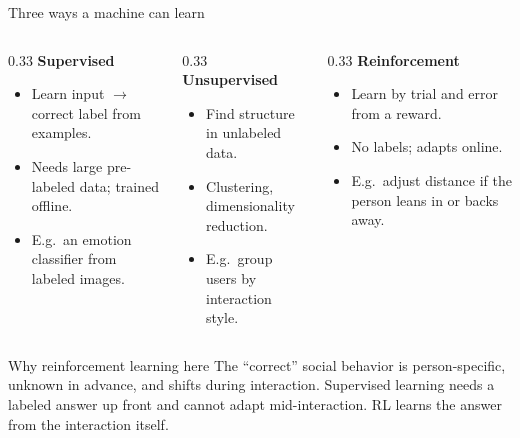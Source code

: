 \documentclass[aspectratio=169,10pt]{beamer}
\begin{document}
\begin{frame}{Three ways a machine can learn}
  \begin{columns}[T]
    \begin{column}{0.33\textwidth}
      \textbf{Supervised}
      \begin{itemize}\footnotesize
        \item Learn input $\to$ correct label from examples.
        \item Needs large pre-labeled data; trained offline.
        \item E.g.\ an emotion classifier from labeled images.
      \end{itemize}
    \end{column}
    \begin{column}{0.33\textwidth}
      \textbf{Unsupervised}
      \begin{itemize}\footnotesize
        \item Find structure in unlabeled data.
        \item Clustering, dimensionality reduction.
        \item E.g.\ group users by interaction style.
      \end{itemize}
    \end{column}
    \begin{column}{0.33\textwidth}
      \textbf{Reinforcement}
      \begin{itemize}\footnotesize
        \item Learn by trial and error from a reward.
        \item No labels; adapts online.
        \item E.g.\ adjust distance if the person leans in or backs away.
      \end{itemize}
    \end{column}
  \end{columns}
  \vspace{0.8em}
  \begin{alertblock}{Why reinforcement learning here}
    The ``correct'' social behavior is person-specific, unknown in advance, and shifts during interaction. Supervised learning needs a labeled answer up front and cannot adapt mid-interaction. RL learns the answer from the interaction itself.
  \end{alertblock}
\end{frame}
\end{document}
